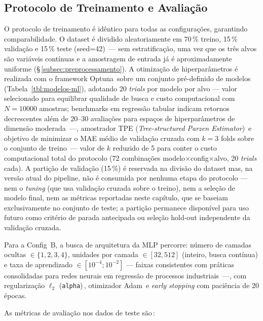 \subsection{Protocolo de Treinamento e Avaliação}
\label{subsec:protocolo}

O protocolo de treinamento é idêntico para todas as configurações, garantindo comparabilidade. O dataset é dividido aleatoriamente em 70\,\% treino, 15\,\% validação e 15\,\% teste (seed=42)\,\cite{kohavi1995study} — sem estratificação, uma vez que os três alvos são variáveis contínuas e a amostragem de entrada já é aproximadamente uniforme (§\,\ref{subsec:preprocessamento}). A otimização de hiperparâmetros é realizada com o framework Optuna\,\cite{akiba2019optuna} sobre um conjunto pré-definido de modelos (Tabela~\ref{tbl:modelos-ml}), adotando 20 \textit{trials} por modelo por alvo — valor selecionado para equilibrar qualidade de busca e custo computacional com $N = 10000$ amostras; benchmarks em regressão tabular indicam retornos decrescentes além de 20--30 avaliações para espaços de hiperparâmetros de dimensão moderada\,\cite{he2021automl} —, amostrador TPE (\textit{Tree-structured Parzen Estimator})\,\cite{bergstra2011tpe} e objetivo de minimizar o MAE médio de validação cruzada com $k = 3$ folds sobre o conjunto de treino\,\cite{kohavi1995study} — valor de $k$ reduzido de 5 para conter o custo computacional total do protocolo (72 combinações modelo$\times$config$\times$alvo, 20 \textit{trials} cada). A partição de validação (15\,\%) é reservada na divisão do dataset mas, na versão atual do pipeline, não é consumida por nenhuma etapa do protocolo — nem o \textit{tuning} (que usa validação cruzada sobre o treino), nem a seleção de modelo final, nem as métricas reportadas neste capítulo, que se baseiam exclusivamente no conjunto de teste; a partição permanece disponível para uso futuro como critério de parada antecipada ou seleção hold-out independente da validação cruzada.

Para a Config~B, a busca de arquitetura da MLP percorre: número de camadas ocultas $\in \{1, 2, 3, 4\}$, unidades por camada $\in [32, 512]$ (inteiro, busca contínua) e taxa de aprendizado $\in [10^{-4}; 10^{-2}]$ — faixas consistentes com práticas consolidadas para redes neurais em regressão de processos industriais\,\cite{goodfellow2016deep,chattopadhyay2022hybrid} —, com regularização $\ell_2$ (\texttt{alpha})\,\cite{hoerl1970ridge}, otimizador Adam\,\cite{kingma2015adam} e \textit{early stopping} com paciência de 20 épocas.

As métricas de avaliação nos dados de teste são\,\cite{bishop2006prml}:

